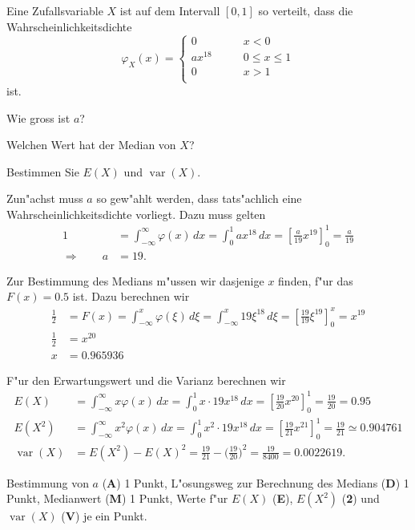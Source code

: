 Eine Zufallsvariable $X$ ist auf dem Intervall $[0,1]$ so verteilt, dass die
Wahrscheinlichkeitsdichte
\[
\varphi_X(x)=\begin{cases}
0&\qquad x < 0\\
ax^{18}&\qquad 0\le x \le 1\\
0&\qquad x > 1\\
\end{cases}
\]
ist.
\begin{teilaufgaben}
\item Wie gross ist $a$?
\item Welchen Wert hat der Median von $X$?
\item Bestimmen Sie $E(X)$ und $\operatorname{var}(X)$.
\end{teilaufgaben}

\begin{loesung}
\begin{teilaufgaben}
\item
Zun"achst muss $a$ so gew"ahlt werden, dass tats"achlich eine
Wahrscheinlichkeitsdichte vorliegt. Dazu muss gelten
\begin{align*}
1
&=
\int_{-\infty}^{\infty} \varphi(x)\,dx
=
\int_0^1 ax^{18}\,dx
=
\left[
\frac{a}{19}x^{19}
\right]_0^1
=\frac{a}{19}
\\
\Rightarrow \qquad a&= 19.
\end{align*}
\item
Zur Bestimmung des Medians m"ussen wir dasjenige $x$ finden, f"ur das 
$F(x)=0.5$ ist. Dazu berechnen wir
\begin{align*}
\frac12
&=
F(x)
=
\int_{-\infty}^x \varphi(\xi)\,d\xi
=
\int_{-\infty}^x 19\xi^{18}\,d\xi
=
\left[
\frac{19}{19}\xi^{19}
\right]_0^x
=x^{19}
\\
\frac12&=x^{20}\\
x&=0.965936
\end{align*}
\item
F"ur den Erwartungswert und die Varianz berechnen wir
\begin{align*}
E(X)
&=
\int_{-\infty}^\infty x\varphi(x)\,dx
=
\int_0^1x\cdot 19x^{18}\,dx
=
\left[
\frac{19}{20}x^{20}
\right]_0^1
=\frac{19}{20}=0.95
\\
E(X^2)
&=
\int_{-\infty}^\infty x^2\varphi(x)\,dx
=
\int_0^1x^2\cdot 19x^{18}\,dx
=
\left[
\frac{19}{21}x^{21}
\right]_0^1
=\frac{19}{21}
\simeq 0.904761
\\
\operatorname{var}(X)
&=
E(X^2)-E(X)^2
=
\frac{19}{21}-\biggl(\frac{19}{20}\biggr)^2
=
\frac{19}{8400}=0.0022619.
\end{align*}
\end{teilaufgaben}
\end{loesung}

\begin{bewertung}
Bestimmung von $a$ ({\bf A}) 1 Punkt,
L"osungsweg zur Berechnung des Medians ({\bf D}) 1 Punkt,
Medianwert ({\bf M}) 1 Punkt,
Werte f"ur $E(X)$ ({\bf E}),
$E(X^2)$  ({\bf 2}) und $\operatorname{var}(X)$ ({\bf V}) je ein Punkt.
\end{bewertung}

